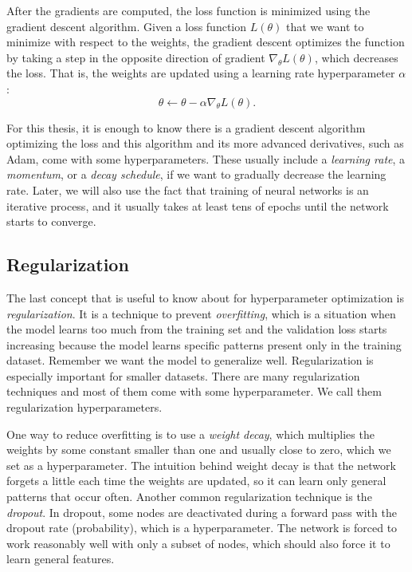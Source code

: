 After the gradients are computed, the loss function is minimized using the gradient descent algorithm. Given a loss function $L(\theta)$ that we want to minimize with respect to the weights, the gradient descent optimizes the function by taking a step in the opposite direction of gradient $\nabla_\theta L(\theta)$, which decreases the loss. That is, the weights are updated using a learning rate hyperparameter $\alpha$: $$ \theta \leftarrow \theta - \alpha \nabla_\theta L(\theta).$$

For this thesis, it is enough to know there is a gradient descent algorithm optimizing the loss and this algorithm and its more advanced derivatives, such as Adam, come with some hyperparameters. These usually include a \textit{learning rate}, a \textit{momentum}, or a \textit{decay schedule}, if we want to gradually decrease the learning rate. Later, we will also use the fact that training of neural networks is an iterative process, and it usually takes at least tens of epochs until the network starts to converge.

\subsection{Regularization}
The last concept that is useful to know about for hyperparameter optimization is \textit{regularization}. It is a technique to prevent \textit{overfitting}, which is a situation when the model learns too much from the training set and the validation loss starts increasing because the model learns specific patterns present only in the training dataset. Remember we want the model to generalize well. Regularization is especially important for smaller datasets. There are many regularization techniques and most of them come with some hyperparameter. We call them regularization hyperparameters.

One way to reduce overfitting is to use a \textit{weight decay}, which multiplies the weights by some constant smaller than one and usually close to zero, which we set as a hyperparameter. The intuition behind weight decay is that the network forgets a little each time the weights are updated, so it can learn only general patterns that occur often. Another common regularization technique is the \textit{dropout}. In dropout, some nodes are deactivated during a forward pass with the dropout rate (probability), which is a hyperparameter. The network is forced to work reasonably well with only a subset of nodes, which should also force it to learn general features.



